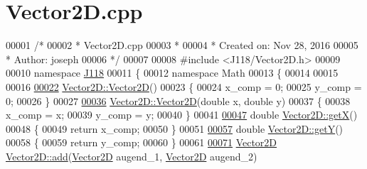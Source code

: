 \hypertarget{_vector2_d_8cpp_source}{}\section{Vector2\+D.\+cpp}
\label{_vector2_d_8cpp_source}

\begin{DoxyCode}
00001 \textcolor{comment}{/*}
00002 \textcolor{comment}{ * Vector2D.cpp}
00003 \textcolor{comment}{ *}
00004 \textcolor{comment}{ *  Created on: Nov 28, 2016}
00005 \textcolor{comment}{ *      Author: joseph}
00006 \textcolor{comment}{ */}
00007 
00008 \textcolor{preprocessor}{#include <J118/Vector2D.h>}
00009 
00010 \textcolor{keyword}{namespace }\hyperlink{namespace_j118}{J118}
00011 \{
00012 \textcolor{keyword}{namespace }Math
00013 \{
00014 
00015 
00016 
\hypertarget{_vector2_d_8cpp_source_l00022}{}\hyperlink{class_j118_1_1_math_1_1_vector2_d_afb5cccf703cc5fb06c48a7a947acb5f3}{00022} \hyperlink{class_j118_1_1_math_1_1_vector2_d_afb5cccf703cc5fb06c48a7a947acb5f3}{Vector2D::Vector2D}()
00023 \{
00024     x\_comp = 0;
00025     y\_comp = 0;
00026 \}
00027 
\hypertarget{_vector2_d_8cpp_source_l00036}{}\hyperlink{class_j118_1_1_math_1_1_vector2_d_abe69953859a6ca6a065547567276ad3c}{00036} \hyperlink{class_j118_1_1_math_1_1_vector2_d_afb5cccf703cc5fb06c48a7a947acb5f3}{Vector2D::Vector2D}(\textcolor{keywordtype}{double} x, \textcolor{keywordtype}{double} y)
00037 \{
00038     x\_comp = x;
00039     y\_comp = y;
00040 \}
00041 
\hypertarget{_vector2_d_8cpp_source_l00047}{}\hyperlink{class_j118_1_1_math_1_1_vector2_d_aaf6a3aac74ce510a72364b7a2c7b1e93}{00047} \textcolor{keywordtype}{double} \hyperlink{class_j118_1_1_math_1_1_vector2_d_aaf6a3aac74ce510a72364b7a2c7b1e93}{Vector2D::getX}()
00048 \{
00049     \textcolor{keywordflow}{return} x\_comp;
00050 \}
00051 
\hypertarget{_vector2_d_8cpp_source_l00057}{}\hyperlink{class_j118_1_1_math_1_1_vector2_d_a20386c667a551511e94c955599f80fb4}{00057} \textcolor{keywordtype}{double} \hyperlink{class_j118_1_1_math_1_1_vector2_d_a20386c667a551511e94c955599f80fb4}{Vector2D::getY}()
00058 \{
00059     \textcolor{keywordflow}{return} y\_comp;
00060 \}
00061 
\hypertarget{_vector2_d_8cpp_source_l00071}{}\hyperlink{class_j118_1_1_math_1_1_vector2_d_a6b13e1c9fc5c758c1e18a6b74d1182b2}{00071} \hyperlink{class_j118_1_1_math_1_1_vector2_d}{Vector2D} \hyperlink{class_j118_1_1_math_1_1_vector2_d_a6b13e1c9fc5c758c1e18a6b74d1182b2}{Vector2D::add}(\hyperlink{class_j118_1_1_math_1_1_vector2_d}{Vector2D} augend\_1, \hyperlink{class_j118_1_1_math_1_1_vector2_d}{Vector2D} augend\_2)

\end{DoxyCode}
